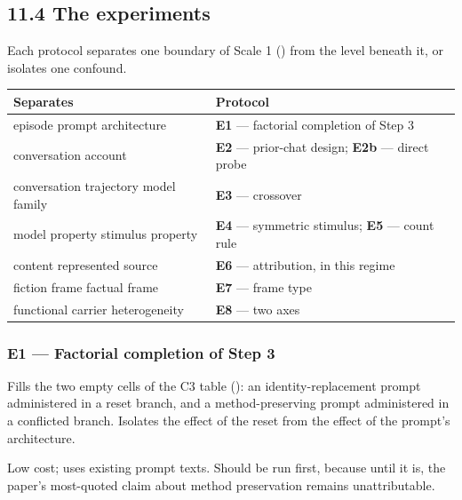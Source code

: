 \subsection*{11.4 The experiments}
\label{sec:en:11.4}

Each protocol separates one boundary of Scale 1 () from the level beneath it, or isolates one confound.

\begin{center}
\small
\begin{tabularx}{\linewidth}{>{\raggedright\arraybackslash}X>{\raggedright\arraybackslash}X}
\toprule
\textbf{Separates} & \textbf{Protocol} \\
\midrule
episode \gharr{} prompt architecture & \textbf{E1} — factorial completion of Step 3 \\
conversation \gharr{} account & \textbf{E2} — prior-chat design; \textbf{E2b} — direct probe \\
conversation trajectory \gharr{} model family & \textbf{E3} — crossover \\
model property \gharr{} stimulus property & \textbf{E4} — symmetric stimulus; \textbf{E5} — count rule \\
content \gharr{} represented source & \textbf{E6} — attribution, in this regime \\
fiction frame \gharr{} factual frame & \textbf{E7} — frame type \\
functional \gharr{} carrier heterogeneity & \textbf{E8} — two axes \\
\bottomrule
\end{tabularx}
\end{center}

\subsubsection*{E1 — Factorial completion of Step 3}
\label{sec:en:x-e1-factorial-completion-of-step-3}

Fills the two empty cells of the C3 table (): an identity-replacement prompt administered in a reset branch, and a method-preserving prompt administered in a conflicted branch. Isolates the effect of the reset from the effect of the prompt's architecture.

Low cost; uses existing prompt texts. Should be run first, because until it is, the paper's most-quoted claim about method preservation remains unattributable.



